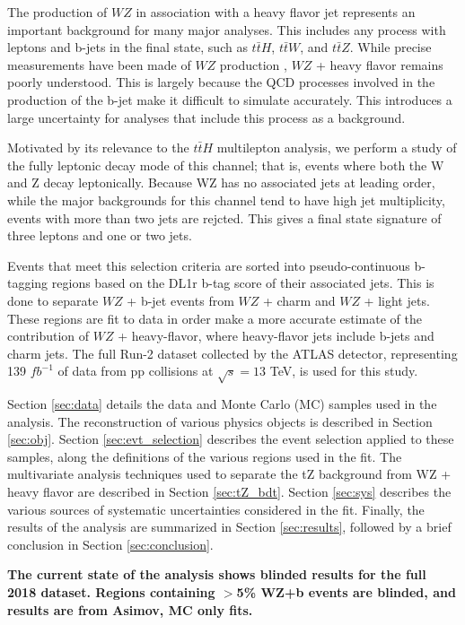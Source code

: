 
The production of $WZ$ in association with a heavy flavor jet represents an important background for many major analyses. This includes any process with leptons and b-jets in the final state, such as $t\bar{t}H$, $t\bar{t}W$, and $t\bar{t}Z$. While precise measurements have been made of $WZ$ production \cite{WZ_36}, $WZ$ + heavy flavor remains poorly understood. This is largely because the QCD processes involved in the production of the b-jet make it difficult to simulate accurately. This introduces a large uncertainty for analyses that include this process as a background.  

Motivated by its relevance to the $t\bar{t}H$ multilepton analysis, we perform a study of the fully leptonic decay mode of this channel; that is, events where both the W and Z decay leptonically. Because WZ has no associated jets at leading order, while the major backgrounds for this channel tend to have high jet multiplicity, events with more than two jets are rejcted. This gives a final state signature of three leptons and one or two jets.

Events that meet this selection criteria are sorted into pseudo-continuous b-tagging regions based on the DL1r b-tag score of their associated jets. This is done to separate $WZ$ + b-jet events from $WZ$ + charm and $WZ$ + light jets. These regions are fit to data in order make a more accurate estimate of the contribution of $WZ$ + heavy-flavor, where heavy-flavor jets include b-jets and charm jets. The full Run-2 dataset collected by the ATLAS detector, representing 139 $fb^{-1}$ of data from pp collisions at $\sqrt{s} = 13$ TeV, is used for this study.

Section \ref{sec:data} details the data and Monte Carlo (MC) samples used in the analysis. The reconstruction of various physics objects is described in Section \ref{sec:obj}. Section \ref{sec:evt_selection} describes the event selection applied to these samples, along the definitions of the various regions used in the fit. The multivariate analysis techniques used to separate the tZ background from WZ + heavy flavor are described in Section \ref{sec:tZ_bdt}. Section \ref{sec:sys} describes the various sources of systematic uncertainties considered in the fit. Finally, the results of the analysis are summarized in Section \ref{sec:results}, followed by a brief conclusion in Section \ref{sec:conclusion}.

\textbf{The current state of the analysis shows blinded results for the full 2018 dataset. Regions containing $>$5\% WZ+b events are blinded, and results are from Asimov, MC only fits.}
